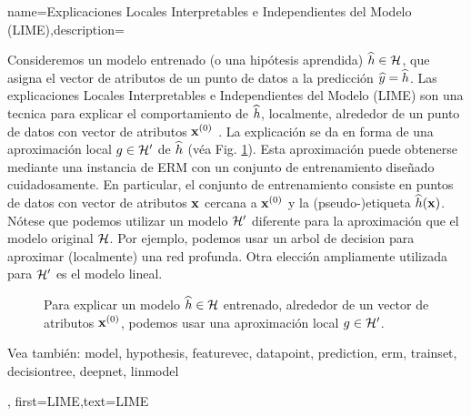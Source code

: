 {name={Explicaciones Locales Interpretables e Independientes del Modelo (LIME)},description={
		Consideremos 
		un modelo entrenado (o una hipótesis aprendida) $\widehat{h} \in \mathcal{H}$, 
		que asigna el vector de atributos de un punto de datos a la predicción $\widehat{y}= \widehat{h}$. 
		Las explicaciones Locales Interpretables e Independientes del Modelo (LIME) son una tecnica para explicar 
		el comportamiento de $\widehat{h}$, localmente, alrededor de un punto de datos con vector de atributos ${\bf x}^{(0)}$ \cite{Ribeiro2016}. 
		La explicación se da en forma de una aproximación local $g \in \mathcal{H}'$ de $\widehat{h}$ (véa Fig. \ref{fig_lime_dict}). 
		Esta aproximación puede obtenerse mediante una instancia de ERM con un 
		conjunto de entrenamiento diseñado cuidadosamente. En particular, el conjunto de entrenamiento consiste en puntos de datos con 
		vector de atributos ${\bf x}$ cercana a ${\bf x}^{(0)}$ y la (pseudo-)etiqueta $\widehat{h}({\bf x})$. 
		Nótese que podemos utilizar un modelo $\mathcal{H}'$ diferente para la aproximación que 
		el modelo original $\mathcal{H}$. Por ejemplo, podemos usar un arbol de decision
		para aproximar (localmente) una red profunda. Otra elección ampliamente utilizada para $\mathcal{H}'$ es 
		el modelo lineal. 
		\begin{figure}[H]
		\begin{center}
		\end{center}
		\caption{Para explicar un modelo $\widehat{h} \in \mathcal{H}$ entrenado, alrededor de un vector de atributos ${\bf x}^{(0)}$, podemos usar una aproximación local $g \in \mathcal{H}'$. }
		\label{fig_lime_dict}
		\end{figure}
		Vea también: \gls{model}, \gls{hypothesis}, \gls{featurevec}, \gls{datapoint}, \gls{prediction}, \gls{erm}, \gls{trainset}, \gls{decisiontree}, \gls{deepnet}, \gls{linmodel}  },
	first={LIME},text={LIME}
}



